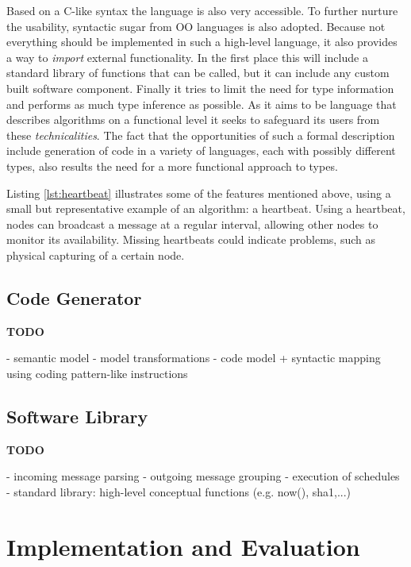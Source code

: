 \documentclass[conference]{IEEEtran}
\newcommand{\TODO}{\textbf{\color{red}TODO}}
\newcommand{\NAME}{id-foo\xspace}
\begin{document}
Based on a C-like syntax the language is also very accessible. To further
nurture the usability, syntactic sugar from OO languages is also adopted.
Because not everything should be implemented in such a high-level language, it
also provides a way to \emph{import} external functionality. In the first place
this will include a standard library of functions that can be called, but it
can include any custom built software component. Finally it tries to limit the
need for type information and performs as much type inference as possible. As
it aims to be language that describes algorithms on a functional level it seeks
to safeguard its users from these \emph{technicalities}. The fact that the
opportunities of such a formal description include generation of code in a
variety of languages, each with possibly different types, also results the need
for a more functional approach to types.

Listing \ref{lst:heartbeat} illustrates some of the features mentioned above,
using a small but representative example of an algorithm: a heartbeat. Using a
heartbeat, nodes can broadcast a message at a regular interval, allowing other
nodes to monitor its availability. Missing heartbeats could indicate problems,
such as physical capturing of a certain node.



\subsection{Code Generator}

\TODO

- semantic model \cite{fowler2010domain}
- model transformations
- code model + syntactic mapping using coding pattern-like instructions

\subsection{Software Library}

\TODO

- incoming message parsing
- outgoing message grouping
- execution of schedules
- standard library: high-level conceptual functions (e.g. now(), sha1,...)

\section{Implementation and Evaluation}
\label{evaluation}
\end{document}
